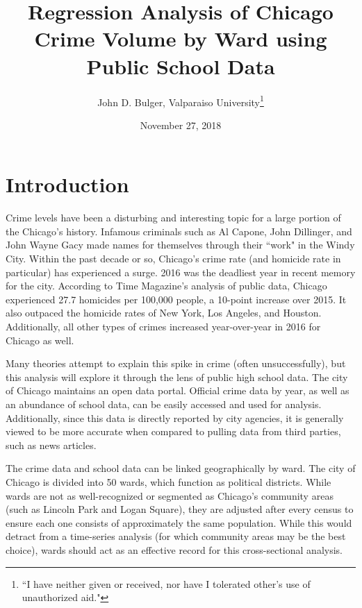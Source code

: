 \documentclass[12pt]{article}
\title{Regression Analysis of Chicago Crime Volume by Ward using Public School Data}
\author{John D. Bulger, Valparaiso University\thanks{``I have neither given or received, nor have I tolerated other’s use of unauthorized aid."}}
\date{November 27, 2018}
\begin{document}
	\maketitle

	\section{Introduction}
	
Crime levels have been a disturbing and interesting topic for a large portion of the Chicago's history.  Infamous criminals such as Al Capone, John Dillinger, and John Wayne Gacy made names for themselves through their ``work" in the Windy City.  Within the past decade or so, Chicago’s crime rate (and homicide rate in particular) has experienced a surge.  2016 was the deadliest year in recent memory for the city.  According to Time Magazine's analysis of public data, Chicago experienced 27.7 homicides per 100,000 people, a 10-point increase over 2015.  It also outpaced the homicide rates of New York, Los Angeles, and Houston.  Additionally, all other types of crimes increased year-over-year in 2016 for Chicago as well.\cite{sanburn}

\par

Many theories attempt to explain this spike in crime (often unsuccessfully), but this analysis will explore it through the lens of public high school data.  The city of Chicago maintains an open data portal.  Official crime data by year, as well as an abundance of school data, can be easily accessed and used for analysis.  Additionally, since this data is directly reported by city agencies, it is generally viewed to be more accurate when compared to pulling data from third parties, such as news articles.

\par

The crime data and school data can be linked geographically by ward.  The city of Chicago is divided into 50 wards, which function as political districts.  While wards are not as well-recognized or segmented as Chicago’s community areas (such as Lincoln Park and Logan Square), they are adjusted after every census to ensure each one consists of approximately the same population.  While this would detract from a time-series analysis (for which community areas may be the best choice), wards should act as an effective record for this cross-sectional analysis.

\par
\end{document}
